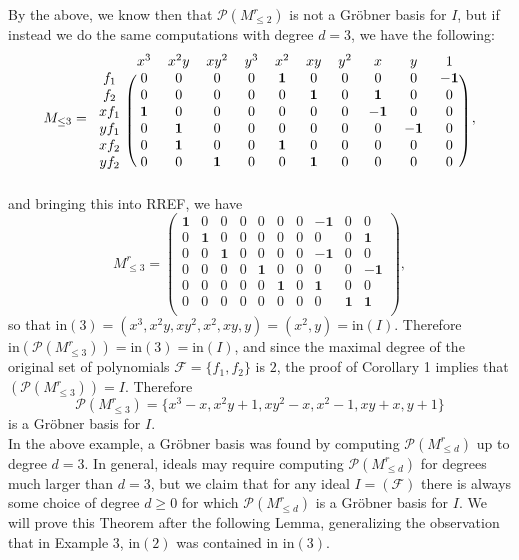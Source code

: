 \documentclass[12pt]{article}
\newcommand{\init}{\text{in}}
\newcommand{\Poly}{\mathscr{P}}
\newcommand{\F}{\mathcal{F}}
\begin{document}
By the above, we know then that $\Poly(M_{\leq 2}^r)$ is not a Gröbner basis for $I$, but if instead we do the same computations with degree $d = 3$, we have the following: \[ M_{\leq 3} = \begin{blockarray}{ccccccccccc}
    & x^3 & x^2y & xy^2 & y^3 & x^2 & xy & y^2 & x & y & 1 \\
    \begin{block}{c(cccccccccc)}
        f_1 & 0 & 0 & 0 & 0 & \mathbf{1} & 0 & 0 & 0 & 0 & \mathbf{-1} \\
        f_2 & 0 & 0 & 0 & 0 & 0 & \mathbf{1} & 0 & \mathbf{1} & 0 & 0 \\
        xf_1 & \mathbf{1} & 0 & 0 & 0 & 0 & 0 & 0 & \mathbf{-1} & 0 & 0 \\
        yf_1 & 0 & \mathbf{1} & 0 & 0 & 0 & 0 & 0 & 0 & \mathbf{-1} & 0 \\
        xf_2 & 0 & \mathbf{1} & 0 & 0 & \mathbf{1} & 0 & 0 & 0 & 0 & 0 \\
        yf_2 & 0 & 0 & \mathbf{1} & 0 & 0 & \mathbf{1} & 0 & 0 & 0 & 0 \\
    \end{block}
\end{blockarray} \,\,, \] and bringing this into RREF, we have \[ M_{\leq 3}^r = \begin{pmatrix}
	\mathbf{1} & 0 & 0 & 0 & 0 & 0 & 0 & \mathbf{-1} & 0 & 0 \\
	0 & \mathbf{1} & 0 & 0 & 0 & 0 & 0 & 0 & 0 & \mathbf{1} \\
	0 & 0 & \mathbf{1} & 0 & 0 & 0 & 0 & \mathbf{-1} & 0 & 0 \\
	0 & 0 & 0 & 0 & \mathbf{1} & 0 & 0 & 0 & 0 & \mathbf{-1} \\
	0 & 0 & 0 & 0 & 0 & \mathbf{1} & 0 & \mathbf{1} & 0 & 0 \\
	0 & 0 & 0 & 0 & 0 & 0 & 0 & 0 & \mathbf{1} & \mathbf{1} \\
\end{pmatrix}, \] so that $\init(3) = (x^3, x^2y, xy^2, x^2, xy, y) = (x^2, y) = \init(I)$. Therefore $\init(\Poly(M_{\leq 3}^r)) = \init(3) = \init(I)$, and since the maximal degree of the original set of polynomials $\F = \{f_1, f_2\}$ is $2$, the proof of Corollary 1 implies that $(\Poly(M_{\leq 3}^r)) = I$. Therefore \[ \Poly(M_{\leq 3}^r) = \{x^3 - x, x^2y + 1, xy^2 - x, x^2 - 1, xy + x, y + 1\} \] is a Gröbner basis for $I$. \\

In the above example, a Gröbner basis was found by computing $\Poly(M_{\leq d}^r)$ up to degree $d = 3$. In general, ideals may require computing $\Poly(M_{\leq d}^r)$ for degrees much larger than $d = 3$, but we claim that for any ideal $I = (\F)$ there is always some choice of degree $d \geq 0$ for which $\Poly(M_{\leq d}^r)$ is a Gröbner basis for $I$. We will prove this Theorem after the following Lemma, generalizing the observation that in Example 3, $\init(2)$ was contained in $\init(3)$. 
\end{document}
